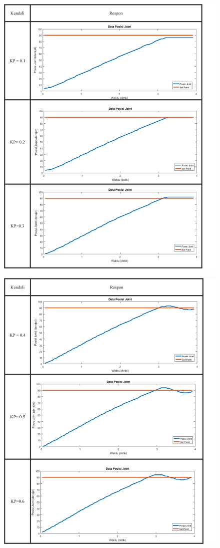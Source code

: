  \begin{figure}[H]
 	\centering
 	\includegraphics[width=13cm]{gambar/kendali1.png}
 \end{figure}

 \begin{figure}[H]
	\centering
	\includegraphics[width=13cm]{gambar/kendali2.png}
\end{figure}

